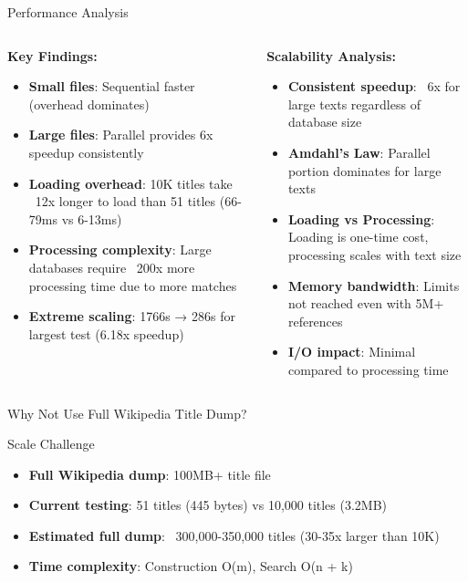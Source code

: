 \documentclass[aspectratio=169]{beamer}
\begin{document}
\begin{frame}{Performance Analysis}
\begin{columns}
\begin{column}{0.5\textwidth}
\textbf{Key Findings:}
\begin{itemize}
    \item \textbf{Small files}: Sequential faster (overhead dominates)
    \item \textbf{Large files}: Parallel provides 6x speedup consistently
    \item \textbf{Loading overhead}: 10K titles take ~12x longer to load than 51 titles (66-79ms vs 6-13ms)
    \item \textbf{Processing complexity}: Large databases require ~200x more processing time due to more matches
    \item \textbf{Extreme scaling}: 1766s → 286s for largest test (6.18x speedup)
\end{itemize}
\end{column}

\begin{column}{0.5\textwidth}
\textbf{Scalability Analysis:}
\begin{itemize}
    \item \textbf{Consistent speedup}: ~6x for large texts regardless of database size
    \item \textbf{Amdahl's Law}: Parallel portion dominates for large texts
    \item \textbf{Loading vs Processing}: Loading is one-time cost, processing scales with text size
    \item \textbf{Memory bandwidth}: Limits not reached even with 5M+ references
    \item \textbf{I/O impact}: Minimal compared to processing time
\end{itemize}
\end{column}
\end{columns}
\end{frame}

\begin{frame}{Why Not Use Full Wikipedia Title Dump?}
\begin{block}{Scale Challenge}
\begin{itemize}
    \item \textbf{Full Wikipedia dump}: 100MB+ title file
    \item \textbf{Current testing}: 51 titles (445 bytes) vs 10,000 titles (3.2MB)
    \item \textbf{Estimated full dump}: ~300,000-350,000 titles (30-35x larger than 10K)
    \item \textbf{Time complexity}: Construction O(m), Search O(n + k)
\end{itemize}
\end{block}
\end{frame}
\end{document}
